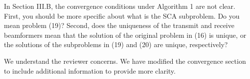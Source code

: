  In Section III.B, the convergence conditions under Algorithm 1 are not clear. First, you should be more specific about what is the SCA subproblem. Do you mean problem (19)? Second, does the uniqueness of the transmit and receive beamformers mean that the solution of the original problem in (16) is unique, or the solutions of the subproblems in (19) and (20) are unique, respectively?

\resp We understand the reviewer concerns. We have modified the convergence section to include additional information to provide more clarity. 